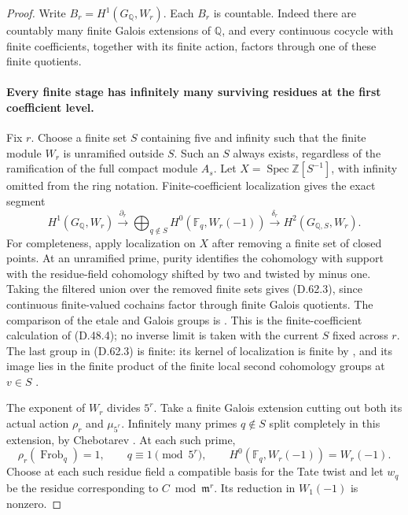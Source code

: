\begin{proof}
Write \(B_r=H^1(G_{\mathbb Q},W_r)\). Each \(B_r\)
is countable. Indeed there are countably many finite
Galois extensions of \(\mathbb Q\), and every continuous
cocycle with finite coefficients, together with its finite
action, factors through one of these finite quotients.

\paragraph{Every finite stage has infinitely many surviving
residues at the first coefficient level.}
Fix \(r\). Choose a finite set \(S\) containing five and
infinity such that the finite module \(W_r\) is unramified
outside \(S\). Such an \(S\) always exists, regardless of
the ramification of the full compact module \(A_s\).
Let \(X=\operatorname{Spec}\mathbb Z[S^{-1}]\), with
infinity omitted from the ring notation. Finite-coefficient
localization gives the exact segment
\[
 H^1(G_{\mathbb Q},W_r)
 \xrightarrow{\partial_r}
 \bigoplus_{q\notin S}H^0(\mathbb F_q,W_r(-1))
 \xrightarrow{\delta_r} H^2(G_{\mathbb Q,S},W_r).
                                                        \tag{D.62.3}
\]
For completeness, apply localization on \(X\) after
removing a finite set of closed points. At an unramified
prime, purity identifies the cohomology with support
with the residue-field cohomology shifted by two and
twisted by minus one. Taking the filtered union over
the removed finite sets gives (D.62.3), since continuous
finite-valued cochains factor through finite Galois
quotients. The comparison of the etale and Galois groups
is \cite[II, Proposition 2.9]{DE_MilneADT}. This is the
finite-coefficient calculation of (D.48.4); no inverse
limit is taken with the current \(S\) fixed across \(r\).
The last group in (D.62.3) is finite: its kernel of
localization is finite by
\cite[I, Theorem 4.10(a)]{DE_MilneADT}, and its image
lies in the finite product of the finite local second
cohomology groups at \(v\in S\)
\cite[I, Corollary 2.3]{DE_MilneADT}.

The exponent of \(W_r\) divides \(5^r\). Take a finite
Galois extension cutting out both its actual action
\(\rho_r\) and \(\mu_{5^r}\). Infinitely many primes
\(q\notin S\) split completely in this extension, by
Chebotarev \cite[Chapter V, Theorem 3.23]{PBC_MilneCFT}. At each such prime,
\[
 \rho_r(\operatorname{Frob}_q)=1,
 \qquad q\equiv1\pmod{5^r},
 \qquad H^0(\mathbb F_q,W_r(-1))=W_r(-1).
                                                        \tag{D.62.4}
\]
Choose at each such residue field a compatible basis
for the Tate twist and let \(w_q\) be the residue
corresponding to \(C\bmod\mathfrak m^r\). Its reduction
in \(W_1(-1)\) is nonzero.


\end{proof}
